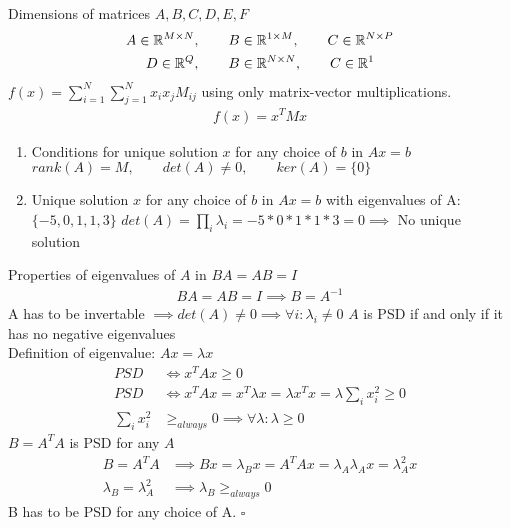 %
%
Dimensions of matrices $A, B, C, D, E, F$
%
\begin{align}
	A \in \mathbb{R}^{M \times N}, \qquad B &\in \mathbb{R}^{1 \times M}, \qquad C \in \mathbb{R}^{N \times P}\\
	D \in \mathbb{R}^{Q}, \qquad B &\in \mathbb{R}^{N \times N}, \qquad C \in \mathbb{R}^{1}
\end{align}%
%
$f(x) = \sum_{i=1}^{N}\sum_{j=1}^{N}x_ix_jM_{ij}$ using only matrix-vector multiplications.
%
\begin{align}
	f(x) = x^TMx
\end{align}
%
%
\begin{enumerate}[label=(\alph*)]
	\item Conditions for unique solution $x$ for any choice of $b$ in $Ax=b$
	\subitem $rank(A)=M,\qquad det(A) \neq 0,\qquad ker(A) = \{0\}$

	\item Unique solution $x$ for any choice of $b$ in $Ax=b$ with eigenvalues of A: $\{-5,0,1,1,3\}$
	\subitem $det(A) = \prod_{i}\lambda_i = -5*0*1*1*3 = 0 \implies$ No unique solution
\end{enumerate}
%
%
Properties of eigenvalues of $A$ in $BA = AB = I$
%
\begin{align}
BA = AB = I \implies B = A^{-1}
\end{align}
A has to be invertable $\implies det(A) \neq 0 \implies \forall i: \lambda_i \neq 0$
%
$A$ is PSD if and only if it has no negative eigenvalues\\
%
Definition of eigenvalue: $Ax = \lambda x$
%
\begin{align}
	PSD &\Leftrightarrow x^TAx \geq 0\\
	PSD &\Leftrightarrow x^TAx = x^T \lambda x = \lambda x^T x = \lambda \sum_{i} x_i^2 \geq 0\\
	\sum_{i} x_i^2 &\geq_{always} 0 \implies \forall \lambda: \lambda \geq 0
\end{align}
%
%
$B = A^T A$ is PSD for any $A$
%
\begin{align}
	B = A^T A &\implies Bx = \lambda_B x = A^T A x = \lambda_A \lambda_A x = \lambda_A^2 x\\
	\lambda_B = \lambda_A^2 &\implies \lambda_B \geq_{always} 0
\end{align}
B has to be PSD for any choice of A. \qquad \ensuremath{\square}










